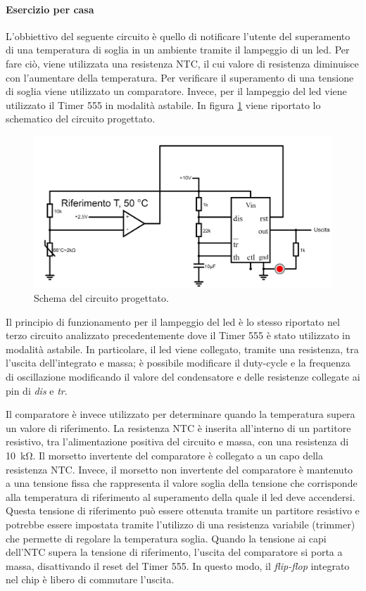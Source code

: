 \clearpage
\paragraph{Esercizio per casa}
L'obbiettivo del seguente circuito è quello di notificare l'utente del superamento di una temperatura di soglia in un ambiente tramite il lampeggio di un led. Per fare ciò, viene utilizzata una resistenza NTC, il cui valore di resistenza diminuisce con l'aumentare della temperatura. Per verificare il superamento di una tensione di soglia viene utilizzato un comparatore. Invece, per il lampeggio del led viene utilizzato il Timer 555 in modalità astabile. In figura \ref{fig:esercizio} viene riportato lo schematico del circuito progettato. 
\begin{figure}[tbh]
	\centering
	\includegraphics[width=\linewidth]{./ImageFiles/Laboratorio 5/eserciziocasa.jpg}
	\caption{Schema del circuito progettato.}
	\label{fig:esercizio}
\end{figure}

\noindent
Il principio di funzionamento per il lampeggio del led è lo stesso riportato nel terzo circuito analizzato precedentemente dove il Timer 555 è stato utilizzato in modalità astabile. In particolare, il led viene collegato, tramite una resistenza, tra l'uscita dell'integrato e massa; è possibile modificare il duty-cycle e la frequenza di oscillazione modificando il valore del condensatore e delle resistenze collegate ai pin di \textit{dis} e \textit{tr}.

\noindent
Il comparatore è invece utilizzato per determinare quando la temperatura supera un valore di riferimento. La resistenza NTC è inserita all'interno di un partitore resistivo, tra l'alimentazione positiva del circuito e massa, con una resistenza di \SI{10}{\kilo\ohm}. Il morsetto invertente del comparatore è collegato a un capo della resistenza NTC. Invece, il morsetto non invertente del comparatore è mantenuto a una tensione fissa che rappresenta il valore soglia della tensione che corrisponde alla temperatura di riferimento al superamento della quale il led deve accendersi. Questa tensione di riferimento può essere ottenuta tramite un partitore resistivo e potrebbe essere impostata tramite l'utilizzo di una resistenza variabile (trimmer) che permette di regolare la temperatura soglia. Quando la tensione ai capi dell'NTC supera la tensione di riferimento, l'uscita del comparatore si porta a massa, disattivando il reset del Timer 555. In questo modo, il \textit{flip-flop} integrato nel chip è libero di commutare l'uscita.


